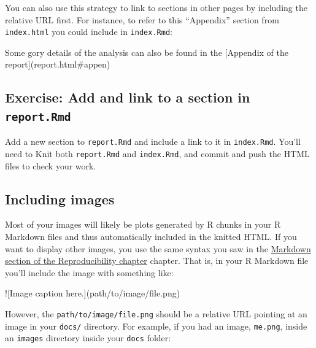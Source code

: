 \documentclass[]{Nemilov}
\newenvironment{Shaded}{\begin{snugshade}}{\end{snugshade}}
\newcommand{\AlertTok}[1]{\textcolor[rgb]{0.94,0.16,0.16}{#1}}
\newcommand{\NormalTok}[1]{#1}
\newcommand{\OtherTok}[1]{\textcolor[rgb]{0.56,0.35,0.01}{#1}}
\begin{document}
You can also use this strategy to link to sections in other pages by including the relative URL first. For instance, to refer to this ``Appendix'' section from \texttt{index.html} you could include in \texttt{index.Rmd}:

\begin{Shaded}
\begin{Highlighting}[]
\NormalTok{Some gory details of the analysis can also be found in the }\OtherTok{[Appendix of the report](report.html#appen)}
\end{Highlighting}
\end{Shaded}

\hypertarget{exercise-add-and-link-to-a-section-in-report.rmd}{%
\subsection{\texorpdfstring{Exercise: Add and link to a section in \texttt{report.Rmd}}{Exercise: Add and link to a section in report.Rmd}}\label{exercise-add-and-link-to-a-section-in-report.rmd}}

Add a new section to \texttt{report.Rmd} and include a link to it in \texttt{index.Rmd}. You'll need to Knit both \texttt{report.Rmd} and \texttt{index.Rmd}, and commit and push the HTML files to check your work.

\hypertarget{including-images}{%
\subsection{Including images}\label{including-images}}

Most of your images will likely be plots generated by R chunks in your R Markdown files and thus automatically included in the knitted HTML. If you want to display other images, you use the same syntax you saw in the \protect\hyperlink{r-reproducibility-markdown}{Markdown section of the Reproducibility chapter} chapter. That is, in your R Markdown file you'll include the image with something like:

\begin{Shaded}
\begin{Highlighting}[]
\AlertTok{![Image caption here.](path/to/image/file.png)}
\end{Highlighting}
\end{Shaded}

However, the \texttt{path/to/image/file.png} should be a relative URL pointing at an image in your \texttt{docs/} directory. For example, if you had an image, \texttt{me.png}, inside an \texttt{images} directory inside your \texttt{docs} folder:
\end{document}
